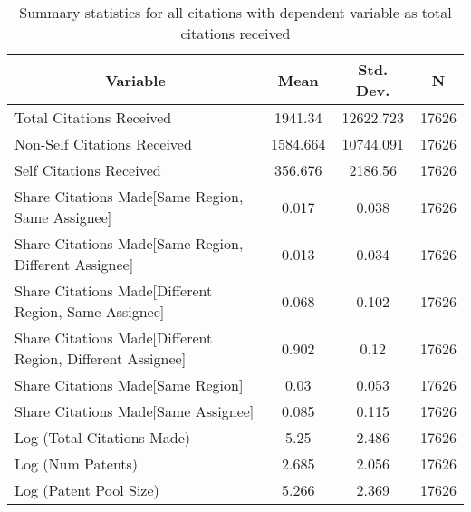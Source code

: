 
\begin{table}[htbp]\centering \caption{Summary statistics for all citations with dependent variable as total citations received \label{a.e.o.t.n.tsummary}}
\begin{tabular}{l c c  c}\hline\hline
\multicolumn{1}{c}{\textbf{Variable}} & \textbf{Mean}
 & \textbf{Std. Dev.} & \textbf{N}\\ \hline
Total Citations Received & 1941.34 & 12622.723  & 17626\\
Non-Self Citations Received & 1584.664 & 10744.091  & 17626\\
Self Citations Received & 356.676 & 2186.56  & 17626\\
Share Citations Made[Same Region, Same Assignee] & 0.017 & 0.038  & 17626\\
Share Citations Made[Same Region, Different Assignee] & 0.013 & 0.034  & 17626\\
Share Citations Made[Different Region, Same Assignee] & 0.068 & 0.102  & 17626\\
Share Citations Made[Different Region, Different Assignee] & 0.902 & 0.12  & 17626\\
Share Citations Made[Same Region] & 0.03 & 0.053  & 17626\\
Share Citations Made[Same Assignee] & 0.085 & 0.115  & 17626\\
Log (Total Citations Made) & 5.25 & 2.486  & 17626\\
Log (Num Patents) & 2.685 & 2.056  & 17626\\
Log (Patent Pool Size) & 5.266 & 2.369  & 17626\\
\hline\end{tabular}
\end{table}
